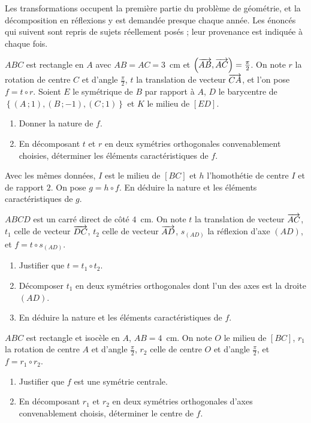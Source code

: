 \begin{annales}
Les transformations occupent la première partie du problème de géométrie, et
la décomposition en réflexions y est demandée presque chaque année. Les
énoncés qui suivent sont repris de sujets réellement posés ; leur provenance
est indiquée à chaque fois.

$ABC$ est rectangle en $A$ avec $AB = AC = 3$~cm et
$\left(\overrightarrow{AB},\overrightarrow{AC}\right) = \frac{\pi}{2}$. On note $r$ la rotation de
centre $C$ et d'angle $\frac{\pi}{2}$, $t$ la translation de vecteur
$\overrightarrow{CA}$, et l'on pose $f = t \circ r$. Soient $E$ le symétrique de $B$ par
rapport à $A$, $D$ le barycentre de
$\left\{(A\,;1),(B\,;-1),(C\,;1)\right\}$ et $K$ le milieu de $[ED]$.
\begin{enumerate}[label=\textbf{\alph*)}, leftmargin=*, itemsep=0.15em]
  \item Donner la nature de $f$.
  \item En décomposant $t$ et $r$ en deux symétries orthogonales
        convenablement choisies, déterminer les éléments caractéristiques de
        $f$.
\end{enumerate}

Avec les mêmes données, $I$ est le milieu de $[BC]$ et $h$ l'homothétie de
centre $I$ et de rapport $2$. On pose $g = h \circ f$. En déduire la nature et
les éléments caractéristiques de $g$.

$ABCD$ est un carré direct de côté $4$~cm. On note $t$ la translation de
vecteur $\overrightarrow{AC}$, $t_{1}$ celle de vecteur $\overrightarrow{DC}$, $t_{2}$ celle de
vecteur $\overrightarrow{AD}$, $s_{(AD)}$ la réflexion d'axe $(AD)$, et
$f = t \circ s_{(AD)}$.
\begin{enumerate}[label=\textbf{\alph*)}, leftmargin=*, itemsep=0.15em]
  \item Justifier que $t = t_{1} \circ t_{2}$.
  \item Décomposer $t_{1}$ en deux symétries orthogonales dont l'un des axes
        est la droite $(AD)$.
  \item En déduire la nature et les éléments caractéristiques de $f$.
\end{enumerate}

$ABC$ est rectangle et isocèle en $A$, $AB = 4$~cm. On note $O$ le milieu de
$[BC]$, $r_{1}$ la rotation de centre $A$ et d'angle $\frac{\pi}{2}$,
$r_{2}$ celle de centre $O$ et d'angle $\frac{\pi}{2}$, et $f = r_{1} \circ
r_{2}$.
\begin{enumerate}[label=\textbf{\alph*)}, leftmargin=*, itemsep=0.15em]
  \item Justifier que $f$ est une symétrie centrale.
  \item En décomposant $r_{1}$ et $r_{2}$ en deux symétries orthogonales
        d'axes convenablement choisis, déterminer le centre de $f$.
\end{enumerate}


\end{annales}

